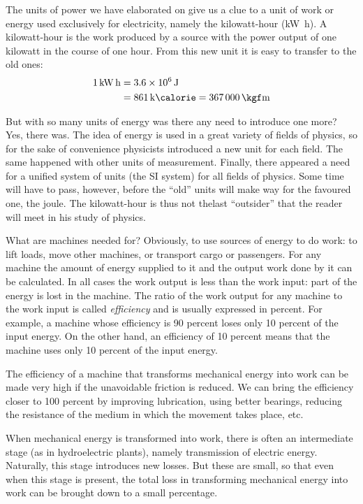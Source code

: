 The units of power we have elaborated on give us a clue
to a unit of work or energy used exclusively for electricity,
namely the kilowatt-hour (\si{\kilo\watt\hour}). A kilowatt-hour is
the work produced by a source with the power output of one kilowatt in the course of one hour. From this new unit it is easy to transfer to the old ones: 
\begin{align*}%
\SI{1}{\kilo\watt\hour} & = \SI{3.6d6}{\joule}\\
& = \SI{861}{\kilo\calorie} = \SI{367 000}{\kgf\meter}
\end{align*}

But with so many units of energy was there any need
to introduce one more? Yes, there was. The idea of energy
is used in a great variety of fields of physics, so for the
sake of convenience physicists introduced a new unit for
each field. The same happened with other units of measurement. Finally, there appeared a need for a unified
system of units (the SI system) for all fields of physics.
Some time will have to pass, however, before the ``old''
units will make way for the favoured one, the joule. The
kilowatt-hour is thus not thelast ``outsider'' that the reader
will meet in his study of physics.

What are machines needed for? Obviously, to use sources
of energy to do work: to lift loads, move other machines,
or transport cargo or passengers. For any machine the
amount of energy supplied to it and the output work done
by it can be calculated. In all cases the work output is
less than the work input: part of the energy is lost in
the machine. The ratio of the work output for any machine to the work input is called \emph{efficiency} and is usually
expressed in percent. For example, a machine whose
efficiency is 90 percent loses only 10 percent of the input energy. On the other hand, an efficiency of 10 percent
means that the machine uses only 10 percent of the input
energy.

The efficiency of a machine that transforms mechanical
energy into work can be made very high if the unavoidable
friction is reduced. We can bring the efficiency closer to
100 percent by improving lubrication, using better bearings, reducing the resistance of the medium in which the
movement takes place, etc.

When mechanical energy is transformed into work,
there is often an intermediate stage (as in hydroelectric
plants), namely transmission of electric energy. Naturally,
this stage introduces new losses. But these are small, so
that even when this stage is present, the total loss in
transforming mechanical energy into work can be brought
down to a small percentage.

